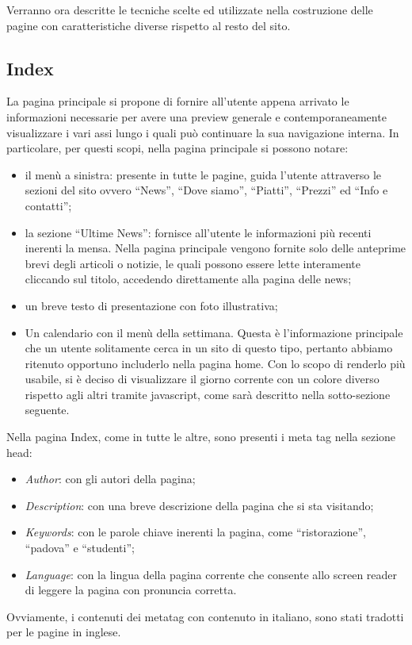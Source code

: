 \documentclass[10pt,a4paper,onecolumn]{article}
\begin{document}
Verranno ora descritte le tecniche scelte ed utilizzate nella costruzione delle pagine con caratteristiche diverse rispetto al resto del sito.

\subsection{Index}

La pagina principale si propone di fornire all'utente appena arrivato le informazioni necessarie per avere una preview generale e contemporaneamente visualizzare i vari assi lungo i quali può continuare la sua navigazione interna. In particolare, per questi scopi, nella pagina principale si possono notare:
\begin{itemize}
 \item il menù a sinistra: presente in tutte le pagine, guida l'utente attraverso le sezioni del sito ovvero ``News'', ``Dove siamo'', ``Piatti'', ``Prezzi'' ed ``Info e contatti'';
 \item la sezione ``Ultime News'': fornisce all'utente le informazioni più recenti inerenti la mensa. Nella pagina principale vengono fornite solo delle anteprime brevi degli articoli o notizie, le quali possono essere lette interamente cliccando sul titolo, accedendo direttamente alla pagina delle news;
 \item un breve testo di presentazione con foto illustrativa;
 \item Un calendario con il menù della settimana. Questa è l'informazione principale che un utente solitamente cerca in un sito di questo tipo, pertanto abbiamo ritenuto opportuno includerlo nella pagina home. Con lo scopo di renderlo più usabile, si è deciso di visualizzare il giorno corrente con un colore diverso rispetto agli altri tramite javascript, come sarà descritto nella sotto-sezione seguente.
\end{itemize}
Nella pagina Index, come in tutte le altre, sono presenti i meta tag nella sezione head:
\begin{itemize}
 \item \textit{Author}: con gli autori della pagina;
 \item \textit{Description}: con una breve descrizione della pagina che si sta visitando;
 \item \textit{Keywords}: con le parole chiave inerenti la pagina, come ``ristorazione'', ``padova'' e ``studenti'';
 \item \textit{Language}: con la lingua della pagina corrente che consente allo screen reader di leggere la pagina con pronuncia corretta.
\end{itemize}
Ovviamente, i contenuti dei metatag con contenuto in italiano, sono stati tradotti per le pagine in inglese.
\end{document}

